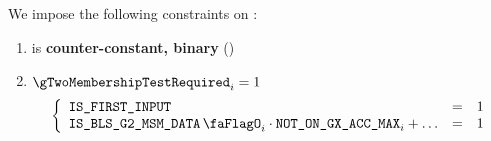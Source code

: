 \noindent
We impose the following constraints on \gTwoMembershipTestRequired{}:
\begin{enumerate}
    \item \gTwoMembershipTestRequired{} is \textbf{counter-constant, binary} \quad (\trash)
    \item \If $\gTwoMembershipTestRequired_{i} = 1$ \Then
        \[
            \left\{ \begin{array}{lcl}
                \isFirstInput & = & 1 \\
                \isBlsGTwoMsmData_{i} \cdot \notOnGXAccMax_{i}  + \hdots & = & 1 \\
            \end{array} \right.
        \]
\end{enumerate}

